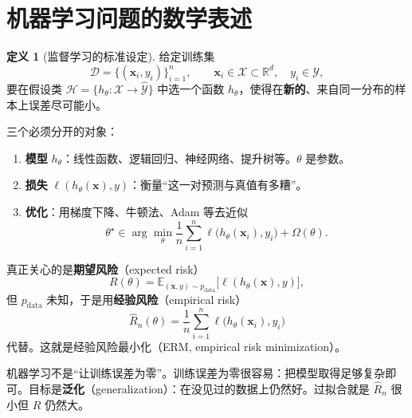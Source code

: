 \documentclass[11pt,a4paper]{article}
\theoremstyle{definition}
\newtheorem{definition}{定义}[section]
\theoremstyle{plain}
\theoremstyle{remark}
\newcommand{\E}{\mathbb{E}}
\newcommand{\R}{\mathbb{R}}
\newcommand{\data}{\mathcal{D}}
\begin{document}
\section{机器学习问题的数学表述}
\label{sec:formulation}

\begin{definition}[监督学习的标准设定]
给定训练集
\begin{equation}
  \data=\{(\mathbf{x}_i,y_i)\}_{i=1}^{n},\qquad \mathbf{x}_i\in\mathcal{X}\subset\R^{d},\quad y_i\in\mathcal{Y},
\end{equation}
要在假设类 $\mathcal{H}=\{h_\theta:\mathcal{X}\to\hat{\mathcal{Y}}\}$ 中选一个函数 $h_\theta$，使得在\textbf{新的}、来自同一分布的样本上误差尽可能小。
\end{definition}

三个必须分开的对象：

\begin{enumerate}[leftmargin=1.6em]
  \item \textbf{模型} $h_\theta$：线性函数、逻辑回归、神经网络、提升树等。$\theta$ 是参数。
  \item \textbf{损失} $\ell(h_\theta(\mathbf{x}),y)$：衡量``这一对预测与真值有多糟''。
  \item \textbf{优化}：用梯度下降、牛顿法、Adam 等去近似
  \begin{equation}
    \theta^\star\in\arg\min_\theta \frac{1}{n}\sum_{i=1}^n \ell\bigl(h_\theta(\mathbf{x}_i),y_i\bigr)+\Omega(\theta).
  \end{equation}
\end{enumerate}

真正关心的是\textbf{期望风险}（expected risk）
\begin{equation}
  R(\theta)=\E_{(\mathbf{x},y)\sim p_{\mathrm{data}}}\bigl[\ell(h_\theta(\mathbf{x}),y)\bigr],
\end{equation}
但 $p_{\mathrm{data}}$ 未知，于是用\textbf{经验风险}（empirical risk）
\begin{equation}
  \hat R_n(\theta)=\frac{1}{n}\sum_{i=1}^n \ell\bigl(h_\theta(\mathbf{x}_i),y_i\bigr)
\end{equation}
代替。这就是经验风险最小化（ERM, empirical risk minimization）。

\begin{keybox}
机器学习不是``让训练误差为零''。训练误差为零很容易：把模型取得足够复杂即可。目标是\textbf{泛化}（generalization）：在没见过的数据上仍然好。过拟合就是 $\hat R_n$ 很小但 $R$ 仍然大。
\end{keybox}
\end{document}

